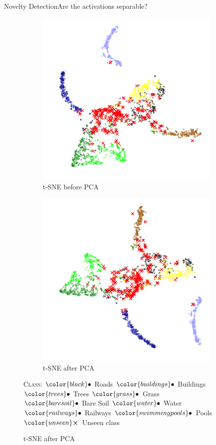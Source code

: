 \documentclass{beamer}
\newcommand{\legendBullet}{\footnotesize	
	\textsc{Class}: 
	${\color{black}\bullet}$ Roads
	${\color{buildings}\bullet}$ Buildings
	${\color{trees}\bullet}$ Trees
	${\color{grass}\bullet}$ Grass\\
	${\color{baresoil}\bullet}$ Bare Soil
	${\color{water}\bullet}$ Water
	${\color{railways}\bullet}$ Railways
	${\color{swimmingpools}\bullet}$ Pools\\
	${\color{unseen}\boldsymbol{\times}}$ Unseen class
}
\begin{document}
\begin{frame}{Novelty Detection}{Are the activations separable?}
\begin{figure}[H]
	\centering
	\begin{subfigure}{.48\textwidth}
		\centering
		\caption{\gls{t-SNE} before \gls{PCA}}
		\includegraphics[width=\textwidth]{t-SNE_wo_cl2_before_PCA}
	\end{subfigure}
	\begin{subfigure}{.48\textwidth}
		\centering
		\caption{\gls{t-SNE} after \gls{PCA}}
		\includegraphics[width=\textwidth]{t-SNE_wo_cl2_after_PCA}
	\end{subfigure}
	\legendBullet
	\label{fig:tsne-zurich}
\end{figure}
\end{frame}
\end{document}
